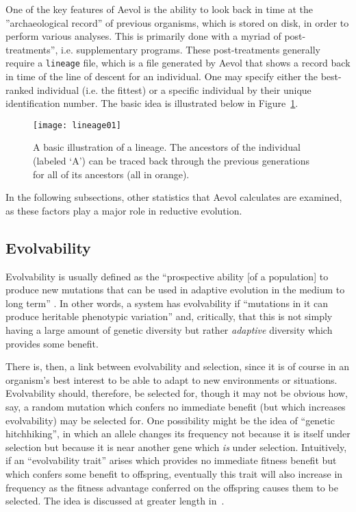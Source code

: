 One of the key features of Aevol is the ability to look back in time at the ''archaeological record'' of previous organisms, which is stored on disk, in order to perform various analyses. This is primarily done with a myriad of post-treatments'', i.e. supplementary programs. These post-treatments generally require a \texttt{lineage} file, which is a file generated by Aevol that shows a record back in time of the line of descent for an individual. One may specify either the best-ranked individual (i.e. the fittest) or a specific individual by their unique identification number. The basic idea is illustrated below in Figure~\ref{fig:lineage01}. 

\begin{figure}[H]
	\texttt{[image: lineage01]}
	\centering
	\caption[Lineage basic illustration.]{A basic illustration of a lineage. The ancestors of the individual (labeled `A') can be traced back through the previous generations for all of its ancestors (all in orange).}
	\label{fig:lineage01}
\end{figure}

In the following subsections, other statistics that Aevol calculates are examined, as these factors play a major role in reductive evolution. 

\subsection{Evolvability}\label{subsec:evolvability}
Evolvability is usually defined as the ``prospective ability [of a population] to produce new mutations that can be used in adaptive evolution in the medium to long term'' \cite{brookfield2009evolution}. In other words, a system has evolvability if ``mutations in it can produce heritable phenotypic variation''\cite{doi:10.1098/rspb.2007.1137} and, critically, that this is not simply having a large amount of genetic diversity but rather \textit{adaptive} diversity which provides some benefit. 

There is, then, a link between evolvability and selection, since it is of course in an organism's best interest to be able to adapt to new environments or situations. Evolvability should, therefore, be selected for, though it may not be obvious how, say, a random mutation which confers no immediate benefit (but which increases evolvability) may be selected for. One possibility might be the idea of ``genetic hitchhiking'', in which an allele changes its frequency not because it is itself under selection but because it is near another gene which \textit{is} under selection. Intuitively, if an ``evolvability trait'' arises which provides no immediate fitness benefit but which confers some benefit to offspring, eventually this trait will also increase in frequency as the fitness advantage conferred on the offspring causes them to be selected. The idea is discussed at greater length in~\cite{selectionEvolvability}. 

